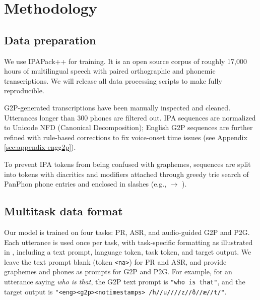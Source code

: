 \section{Methodology}
\subsection{Data preparation}
We use IPAPack++ \cite{zhu-etal-2025-zipa} for training. It is an open source corpus of roughly 17,000 hours of multilingual speech with paired orthographic and phonemic transcriptions. We will release all data processing scripts to make \POWSM fully reproducible.

G2P-generated transcriptions have been manually inspected and cleaned. 
Utterances longer than 300 phones are filtered out. IPA sequences are normalized to Unicode NFD (Canonical Decomposition); English G2P sequences are further refined with rule-based corrections to fix voice-onset time issues (see Appendix \autoref{sec:appendix-engg2p}).

To prevent IPA tokens from being confused with graphemes, sequences are split into tokens with diacritics and modifiers attached through greedy trie search of PanPhon phone entries \cite{panphon} and enclosed in slashes (e.g.,  $\rightarrow$ ).

\subsection{Multitask data format}
Our model is trained on four tasks: PR, ASR, and audio-guided G2P and P2G. Each utterance is used once per task, with task-specific formatting as illustrated in , including a text prompt, language token, task token, and target output. 
We leave the text prompt blank (token \texttt{<na>}) for PR and ASR, and provide graphemes and phones as prompts for G2P and P2G.
For example, for an utterance saying \textit{who is that}, the G2P text prompt is \texttt{"who is that"}, and the target output is \texttt{"<eng><g2p><notimestamps> /h//u////z//ð//æ//t/"}.



